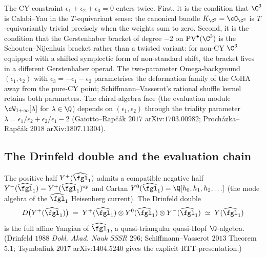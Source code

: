 \begin{remark}
\label{rem:cy-constraint-entry}
The CY constraint $\epsilon_1 + \epsilon_2 + \epsilon_3 = 0$ enters
twice. First, it is the condition that $\C^3$ is Calabi--Yau in the
$T$-equivariant sense: the canonical bundle $K_{\C^3} = \cO_{\C^3}$ is
$T$-equivariantly trivial precisely when the weights sum to zero.
Second, it is the condition that the Gerstenhaber bracket of degree
$-2$ on $\mathrm{PV}^\bullet(\C^3)$ is the Schouten--Nijenhuis bracket
rather than a twisted variant: for non-CY $\C^3$ equipped with a
shifted symplectic form of non-standard shift, the bracket lives in a
different Gerstenhaber operad. The two-parameter Omega-background
$(\epsilon_1, \epsilon_2)$ with $\epsilon_3 = -\epsilon_1 - \epsilon_2$
parametrises the deformation family of the CoHA away from the pure-CY
point; Schiffmann--Vasserot's rational shuffle kernel retains both
parameters. The chiral-algebra face (the evaluation module
$\cW_{1+\infty}[\lambda]$ for $\lambda \in \Q$) depends on $(\epsilon_1,
\epsilon_2)$ through the triality parameter $\lambda = \epsilon_1 /
\epsilon_2 + \epsilon_2 / \epsilon_1 - 2$ (Gaiotto--Rap\v{c}\'ak $2017$
arXiv:$1703.00982$; Proch\'azka--Rap\v{c}\'ak $2018$ arXiv:$1807.11304$).
\end{remark}

\subsection*{The Drinfeld double and the evaluation chain}

\begin{theorem}
\label{thm:drinfeld-double-sv-wave10}
\ClaimStatusProvedElsewhere
The positive half $Y^+(\widehat{\fgl}_1)$ admits a compatible negative
half $Y^-(\widehat{\fgl}_1) = Y^+(\widehat{\fgl}_1)^{\mathrm{op}}$ and
Cartan $Y^0(\widehat{\fgl}_1) = \Q[h_0, h_1, h_2, \ldots]$ (the mode
algebra of the $\widehat{\fgl}_1$ Heisenberg current). The Drinfeld
double
\[
 D\bigl(Y^+(\widehat{\fgl}_1)\bigr)
 \;=\; Y^+(\widehat{\fgl}_1) \otimes Y^0(\widehat{\fgl}_1)
 \otimes Y^-(\widehat{\fgl}_1)
 \;\simeq\; Y(\widehat{\fgl}_1)
\]
is the full affine Yangian of $\widehat{\fgl}_1$, a quasi-triangular
quasi-Hopf $\Q$-algebra. (Drinfeld $1988$ \textit{Dokl. Akad. Nauk SSSR}
$296$; Schiffmann--Vasserot $2013$ Theorem~$5.1$; Tsymbaliuk $2017$
arXiv:$1404.5240$ gives the explicit RTT-presentation.)
\end{theorem}

